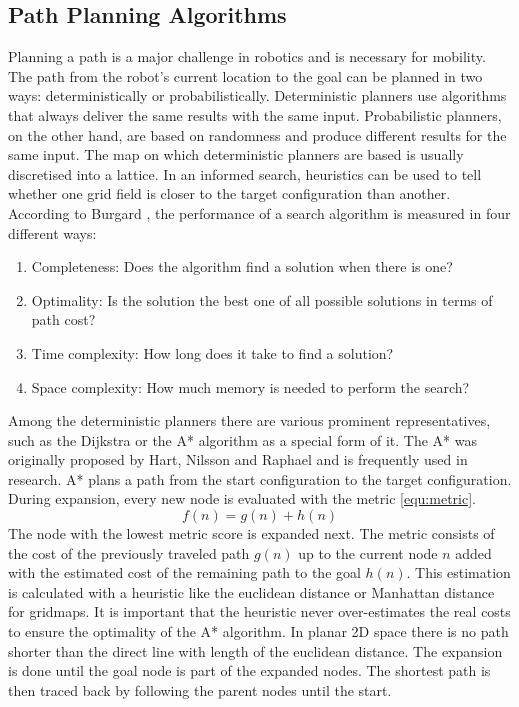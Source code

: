 \subsection{Path Planning Algorithms}
Planning a path is a major challenge in robotics and is necessary for mobility. The path from the robot's current location to the goal can be planned in two ways: deterministically or probabilistically. Deterministic planners use algorithms that always deliver the same results with the same input. Probabilistic planners, on the other hand, are based on randomness and produce different results for the same input. The map on which deterministic planners are based is usually discretised into a lattice. In an informed search, heuristics can be used to tell whether one grid field is closer to the target configuration than another. According to Burgard \cite{burgard_introduction_2021}, the performance of a search algorithm is measured in four different ways:
\begin{enumerate}
    \item Completeness:
    Does the algorithm find a solution when there is one?
    \item Optimality:
    Is the solution the best one of all possible solutions in terms of path cost?
    \item Time complexity:
    How long does it take to find a solution?
    \item Space complexity:
    How much memory is needed to perform the search?
\end{enumerate}

Among the deterministic planners there are various prominent representatives, such as the Dijkstra or the A* algorithm as a special form of it. The A* was originally proposed by Hart, Nilsson and Raphael \cite{hart_formal_1968} and is frequently used in research. A* plans a path from the start configuration to the target configuration. During expansion, every new node is evaluated with the metric \ref{equ:metric}. 
\begin{equation} \label{equ:metric}
    f(n) = g(n) + h(n)
\end{equation}
The node with the lowest metric score is expanded next. The metric consists of the cost of the previously traveled path \(g(n)\) up to the current node \(n\) added with the estimated cost of the remaining path to the goal \(h(n)\). This estimation is calculated with a heuristic like the euclidean distance or Manhattan distance for gridmaps. It is important that the heuristic never over-estimates the real costs to ensure the optimality of the A* algorithm. In planar 2D space there is no path shorter than the direct line with length of the euclidean distance. The expansion is done until the goal node is part of the expanded nodes. The shortest path is then traced back by following the parent nodes until the start.

